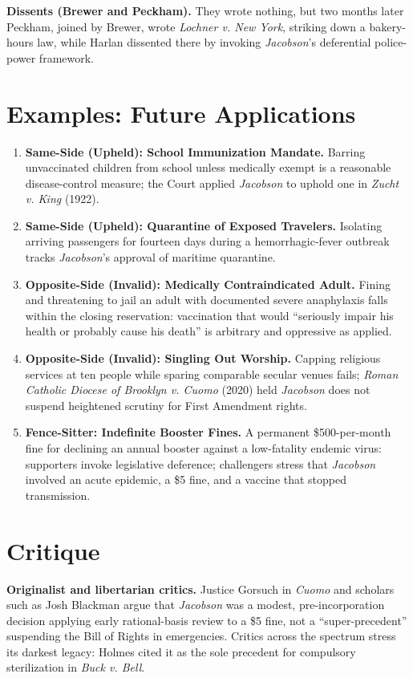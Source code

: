 \documentclass[12pt]{article}
\begin{document}
\textbf{Dissents (Brewer and Peckham).} They wrote nothing, but two months later Peckham, joined by Brewer, wrote \textit{Lochner v. New York}, striking down a bakery-hours law, while Harlan dissented there by invoking \textit{Jacobson}'s deferential police-power framework.

\section{Examples: Future Applications}

\begin{enumerate}
\item \textbf{Same-Side (Upheld): School Immunization Mandate.} Barring unvaccinated children from school unless medically exempt is a reasonable disease-control measure; the Court applied \textit{Jacobson} to uphold one in \textit{Zucht v. King} (1922).
\item \textbf{Same-Side (Upheld): Quarantine of Exposed Travelers.} Isolating arriving passengers for fourteen days during a hemorrhagic-fever outbreak tracks \textit{Jacobson}'s approval of maritime quarantine.
\item \textbf{Opposite-Side (Invalid): Medically Contraindicated Adult.} Fining and threatening to jail an adult with documented severe anaphylaxis falls within the closing reservation: vaccination that would ``seriously impair his health or probably cause his death'' is arbitrary and oppressive as applied.
\item \textbf{Opposite-Side (Invalid): Singling Out Worship.} Capping religious services at ten people while sparing comparable secular venues fails; \textit{Roman Catholic Diocese of Brooklyn v. Cuomo} (2020) held \textit{Jacobson} does not suspend heightened scrutiny for First Amendment rights.
\item \textbf{Fence-Sitter: Indefinite Booster Fines.} A permanent \$500-per-month fine for declining an annual booster against a low-fatality endemic virus: supporters invoke legislative deference; challengers stress that \textit{Jacobson} involved an acute epidemic, a \$5 fine, and a vaccine that stopped transmission.
\end{enumerate}

\section{Critique}

\textbf{Originalist and libertarian critics.} Justice Gorsuch in \textit{Cuomo} and scholars such as Josh Blackman argue that \textit{Jacobson} was a modest, pre-incorporation decision applying early rational-basis review to a \$5 fine, not a ``super-precedent'' suspending the Bill of Rights in emergencies. Critics across the spectrum stress its darkest legacy: Holmes cited it as the sole precedent for compulsory sterilization in \textit{Buck v. Bell}.
\end{document}
